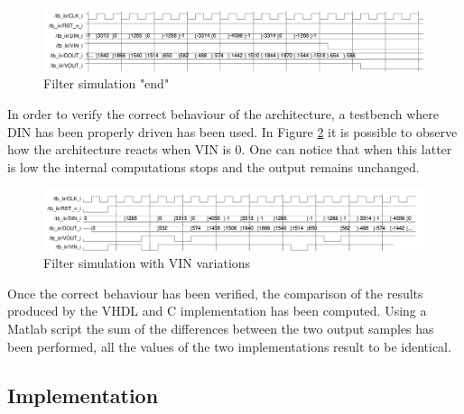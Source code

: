\documentclass[a4paper, titlepage]{article}
\begin{document}
 \begin{figure} [h]
\centering
	\includegraphics[scale=0.55]{end_sim.png}
	\caption{Filter simulation "end"}
	\label{fig:end_sim}
\end{figure} 
    
\noindent In order to verify the correct behaviour of the architecture, a testbench where DIN has been properly driven has been used.
In Figure \ref{fig:vin_sim} it is possible to observe how the architecture reacts when VIN is 0. One can notice that when this latter is low the internal computations stops and the output remains unchanged.
  \begin{figure} [h]
\centering
	\includegraphics[scale=0.12]{image.png}
	\caption{Filter simulation with VIN variations}
	\label{fig:vin_sim}
\end{figure} 

\noindent Once the correct behaviour has been verified, the comparison of the results produced by the VHDL and C implementation has been computed.
Using a Matlab script the sum of the differences between the two output samples has been performed, all the values of the two implementations result to be identical.

\newpage
\subsection{Implementation}
\end{document}
